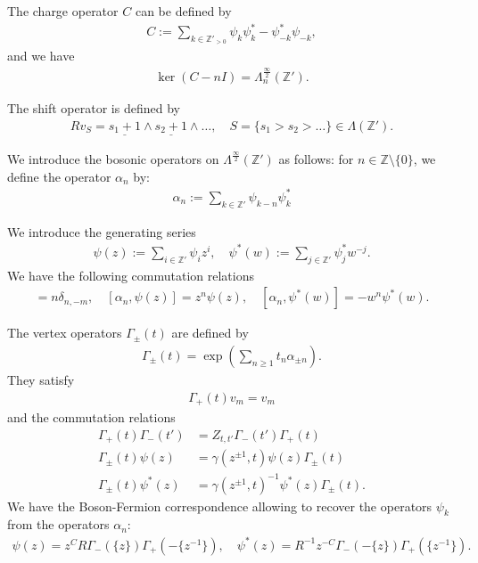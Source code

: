 \documentclass[12pt]{amsart}
\theoremstyle{definition}
\newcommand{\Z}{\mathbb{Z}}
\begin{document}
The charge operator $C$ can be defined by
\begin{align*}
C:= \sum_{ k \in \Z'_{>0}} \psi_k \psi_k^* - \psi_{-k}^* \psi_{-k},
\end{align*}
and we have
\begin{align*}
\ker (C- nI) = \Lambda_n^{\frac{\infty}{2}}(\Z').
\end{align*}

The shift operator is defined by
\begin{align*}
R v_S = \underline{s_1 +1} \wedge \underline{s_2 +1} \wedge \dots, \quad S= \{s_1> s_2> \dots \}  \in \Lambda(\Z').
\end{align*}

We introduce the bosonic operators on $\Lambda^{\frac{\infty}{2}}(\Z')$ as follows: for $n \in \mathbb{Z}\setminus \lbrace 0 \rbrace$, we define the operator $\alpha_n$ by:
\begin{align*}
\alpha_n := \sum_{k \in \mathbb{Z}'} \psi_{k-n}\psi_k^*
\end{align*}

We introduce the generating series
\begin{align*}
\psi(z) := \sum_{i \in \mathbb{Z}'} \psi_i z^i, \quad
\psi^*(w) := \sum_{j \in \mathbb{Z}'} \psi_j^*w^{-j}.
\end{align*}
We have the following commutation relations
\begin{align*}
[\alpha_n ,\alpha_m] = n \delta_{n,-m}, \quad
[\alpha_n , \psi(z) ] = z^n \psi(z), \quad
[\alpha_n , \psi^*(w) ] = -w^n \psi^*(w).
\end{align*}

The vertex operators $\Gamma_{\pm}(t)$ are defined by
\begin{align*}
\Gamma_\pm(t)=\exp\left(\sum_{n \geq 1} t_n \alpha_{\pm n}\right).
\end{align*}
They satisfy
\begin{align} \label{eq:vertexcharge}
\Gamma_+(t) v_m = v_m
\end{align}
and the commutation relations
\begin{align} \label{eq:commutevertex}
\Gamma_+(t) \Gamma_-(t') &= Z_{t,t'} \Gamma_-(t') \Gamma_+(t) \\ \label{eq:commutevertex1}
\Gamma_{\pm }(t) \psi(z) &= \gamma ( z^{ \pm 1} , t ) \psi(z) \Gamma_{ \pm}(t) \\ \label{eq:commutevertex2}
\Gamma_{ \pm}(t) \psi^*(z) &= \gamma( z^{ \pm 1} , t)^{-1} \psi^*(z) \Gamma_{ \pm}(t). 
\end{align}
We have the Boson-Fermion correspondence allowing to recover the operators $\psi_k$ from the operators $\alpha_n$:
\begin{align} \label{eq:bosonfermioncorres}
\psi(z) = z^C R \Gamma_-( \{z\} ) \Gamma_+( - \{z^{-1}\} ), \quad
\psi^*(z) = R^{-1} z^{-C} \Gamma_-( -\{z \} ) \Gamma_+( \{z^{-1} \} ).
\end{align}
\end{document}
